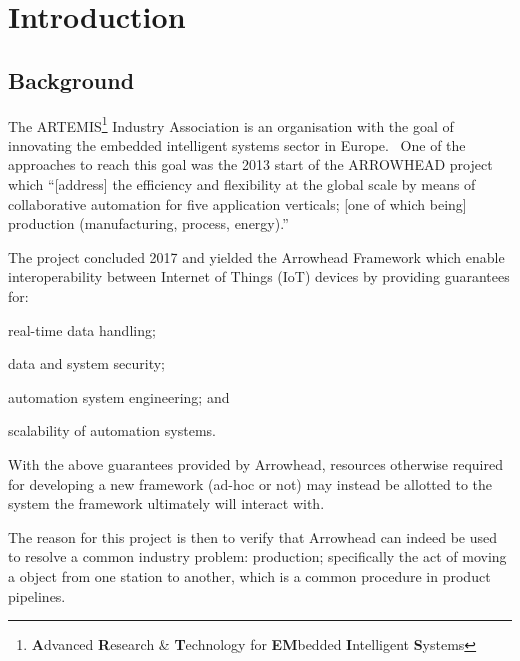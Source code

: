 \section{Introduction}
\subsection{Background}
\label{intro-background}
The ARTEMIS\footnote{\textbf{A}dvanced \textbf{R}esearch \& \textbf{T}echnology for \textbf{EM}bedded \textbf{I}ntelligent \textbf{S}ystems} Industry Association is an organisation with the goal of innovating the embedded intelligent systems sector in Europe.~\parencite{artemis}
One of the approaches to reach this goal was the 2013 start of the ARROWHEAD project which ``[address] the efficiency and flexibility at the global scale by means of collaborative automation for five application verticals; [one of which being] production (manufacturing, process, energy).''~\parencite{arrowhead-project-call}

The project concluded 2017 and yielded the Arrowhead Framework which enable interoperability between Internet of Things (IoT) devices by providing guarantees for:
\begin{inline-enum}
    \item real-time data handling;
    \item data and system security;
    \item automation system engineering; and
    \item scalability of automation systems.
\end{inline-enum}
\parencite{arrowhead-project-about}
With the above guarantees provided by Arrowhead, resources otherwise required for developing a new framework (ad-hoc or not) may instead be allotted to the system the framework ultimately will interact with.

The reason for this project is then to verify that Arrowhead can indeed be used to resolve a common industry problem: production; specifically the act of moving a object from one station to another,
which is a common procedure in product pipelines.



